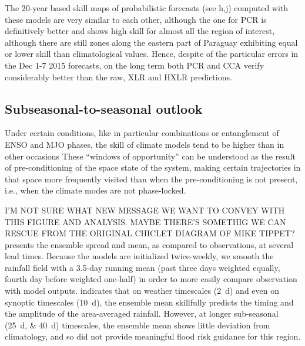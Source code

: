 \documentclass[twocol]{ametsoc}
\begin{document}
The 20-year based skill maps of probabilistic forecasts (see h,j) computed with these models are very similar to each other, although the one for PCR is definitively better and shows high skill for almost all the region of interest, although there are still zones along the eastern part of Paraguay exhibiting equal or lower skill than climatological values. Hence, despite of the particular errors in the Dec 1-7 2015 forecasts, on the long term both PCR and CCA verify considerably better than the raw, XLR and HXLR predictions.

\subsection{Subseasonal-to-seasonal outlook}
Under certain conditions, like in particular combinations or entanglement of ENSO and MJO phases, the skill of climate models tend to be higher than in other occasions \citep{Vitart2016,Moron2015,Munoz2016} These ``windows of opportunity'' can be understood as the result of pre-conditioning of the space state of the system, making certain trajectories in that space more frequently visited than when the pre-conditioning is not present, i.e., when the climate modes are not phase-locked.


I'M NOT SURE WHAT NEW MESSAGE WE WANT TO CONVEY WITH THIS FIGURE AND ANALYSIS. MAYBE THERE'S SOMETHIG WE CAN RESCUE FROM THE ORIGINAL CHICLET DIAGRAM OF MIKE TIPPET?
 presents the ensemble spread and mean, as compared to observations, at several lead times. Because the models are initialized twice-weekly, we smooth the rainfall field with a 3.5-day running mean (past three days weighted equally, fourth day before weighted one-half) in order to more easily compare observation with model outputs.
 indicates that on weather timescales (\SI{2}{\day}) and even on synoptic timescales (\SI{10}{\day}), the ensemble mean skillfully predicts the timing and the amplitude of the area-averaged rainfall.
However, at longer sub-seasonal (\SIlist{25;40}{\day}) timescales, the ensemble mean shows little deviation from climatology, and so did not provide meaningful flood risk guidance for this region.
\end{document}
